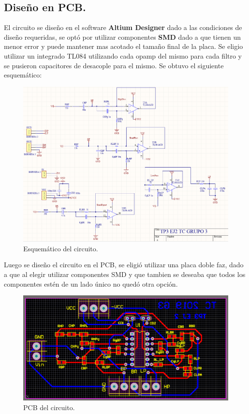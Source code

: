 \documentclass[a4paper]{article}
\begin{document}
\subsection{Diseño en PCB.}
El circuito se diseño en el software \textbf{Altium Designer} dado a las condiciones de diseño requeridas, se optó por utilizar componentes \textbf{SMD} dado a que tienen un menor error y puede mantener mas acotado el tamaño final de la placa.
Se eligio utilizar un integrado TL084 utilizando cada opamp del mismo  para cada filtro y se pusieron capacitores de desacople para el mismo. Se obtuvo el siguiente esquemático:
\begin{figure}[H]	
	\centering
	\includegraphics[width=\textwidth]{ImagenesEj2/esquematico.PNG}
	\caption{Esquemático del circuito.}
	\label{fig:esq}
\end{figure}
Luego se diseño el circuito en el PCB, se eligió utilizar una placa doble faz, dado a que al elegir utilizar componentes SMD y que tambien se deseaba que todos los componentes estén de un lado único no quedó otra opción.
\begin{figure}[H]	
	\centering
	\includegraphics[width=\textwidth]{ImagenesEj2/pcb.PNG}
	\caption{PCB del circuito.}
	\label{fig:pcb}
\end{figure}
\end{document}
